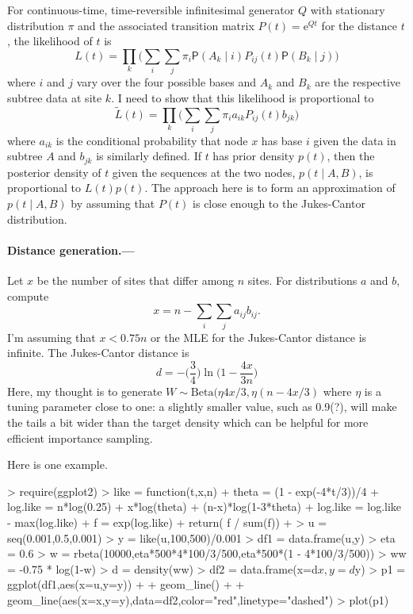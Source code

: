 \documentclass[12pt,letterpaper]{article}
\renewcommand{\Pr}{\mathsf{P}}
\newcommand{\prob}[1]{\Pr\left(#1\right)}
\newcommand{\given}{\mid}
\newcommand{\me}{\mathrm{e}}
\begin{document}
For continuous-time, time-reversible infinitesimal generator $Q$ with stationary distribution $\pi$
and the associated transition matrix $P(t) = \me^{Qt}$ for the distance $t$,
the likelihood of $t$ is
$$
L(t) = \prod_k \Big( \sum_i \sum_j \pi_i \prob{A_k \given  i} P_{ij}(t) \prob{B_k \given j} \Big)
$$
where $i$ and $j$ vary over the four possible bases
and $A_k$ and $B_k$ are the respective subtree data at site $k$.
I need to show that this likelihood is proportional to
$$
\tilde{L}(t) = \prod_k \Big( \sum_i \sum_j \pi_i a_{ik} P_{ij}(t) b_{jk} \Big)
$$
where $a_{ik}$ is the conditional probability that node $x$ has base $i$ given the data in subtree $A$
and $b_{jk}$ is similarly defined.
If $t$ has prior density $p(t)$,
then the posterior density of $t$ given the sequences at the two nodes,
$p(t \given A,B)$,
is proportional to $L(t)p(t)$.
The approach here is to form an approximation of $p(t \given A,B)$
by assuming that $P(t)$ is close enough to the Jukes-Cantor distribution.

\paragraph{Distance generation.---}
Let $x$ be the number of sites that differ among $n$ sites.
For distributions $a$ and $b$,
compute
$$
x = n - \sum_i \sum_j a_{ij}b_{ij}.
$$
I'm assuming that $x < 0.75n$ or the MLE for the Jukes-Cantor distance is infinite.
The Jukes-Cantor distance is
$$
d = - \Big( \frac{3}{4} \Big) \ln \Big( 1 - \frac{4x}{3n} \Big)
$$
Here,
my thought is to generate $W \sim \text{Beta}(\eta 4x/3,\eta(n-4x/3)$
where $\eta$ is a tuning parameter close to one:
a slightly smaller value, such as 0.9(?),
will make the tails a bit wider than the target density which can be helpful for more efficient importance sampling.

Here is one example.

\begin{Schunk}
\begin{Sinput}
> require(ggplot2)
> like = function(t,x,n) {
+     theta = (1 - exp(-4*t/3))/4
+     log.like = n*log(0.25) + x*log(theta) + (n-x)*log(1-3*theta)
+     log.like = log.like - max(log.like)
+     f = exp(log.like)
+     return( f / sum(f))
+ }
> u = seq(0.001,0.5,0.001)
> y = like(u,100,500)/0.001
> df1 = data.frame(u,y)
> eta = 0.6
> w = rbeta(10000,eta*500*4*100/3/500,eta*500*(1 - 4*100/3/500))
> ww = -0.75 * log(1-w)
> d = density(ww)
> df2 = data.frame(x=d$x,y=d$y)
> p1 = ggplot(df1,aes(x=u,y=y)) +
+     geom_line() +
+     geom_line(aes(x=x,y=y),data=df2,color="red",linetype="dashed")
> plot(p1)
\end{Sinput}
\end{Schunk}
\end{document}
